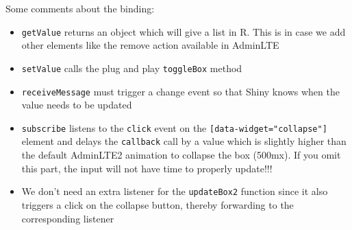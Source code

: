 \documentclass[
]{book}
\newenvironment{Shaded}{\begin{snugshade}}{\end{snugshade}}
\newcommand{\AttributeTok}[1]{\textcolor[rgb]{0.77,0.63,0.00}{#1}}
\newcommand{\DataTypeTok}[1]{\textcolor[rgb]{0.13,0.29,0.53}{#1}}
\newcommand{\DecValTok}[1]{\textcolor[rgb]{0.00,0.00,0.81}{#1}}
\newcommand{\KeywordTok}[1]{\textcolor[rgb]{0.13,0.29,0.53}{\textbf{#1}}}
\newcommand{\NormalTok}[1]{#1}
\newcommand{\OperatorTok}[1]{\textcolor[rgb]{0.81,0.36,0.00}{\textbf{#1}}}
\newcommand{\StringTok}[1]{\textcolor[rgb]{0.31,0.60,0.02}{#1}}
\newcommand{\VariableTok}[1]{\textcolor[rgb]{0.00,0.00,0.00}{#1}}
\providecommand{\tightlist}{%
  \setlength{\itemsep}{0pt}\setlength{\parskip}{0pt}}
\begin{document}
\begin{Shaded}
\end{Shaded}

Some comments about the binding:

\begin{itemize}
\tightlist
\item
  \texttt{getValue} returns an object which will give a list in R. This is in case we add other elements like the remove action available in AdminLTE
\item
  \texttt{setValue} calls the plug and play \texttt{toggleBox} method
\item
  \texttt{receiveMessage} must trigger a change event so that Shiny knows when the value needs to be updated
\item
  \texttt{subscribe} listens to the \texttt{click} event on the \texttt{{[}data-widget="collapse"{]}} element and delays the \texttt{callback} call by a value which is slightly higher than the default AdminLTE2 animation to collapse the box (500mx). If you omit this part, the input will not have time to properly update!!!
\item
  We don't need an extra listener for the \texttt{updateBox2} function since it also triggers a click on the collapse button, thereby forwarding to the corresponding listener
\end{itemize}
\end{document}
